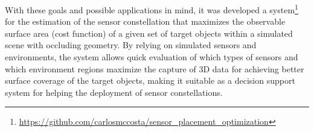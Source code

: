 With these goals and possible applications in mind, it was developed a system\footnote{\url{https://github.com/carlosmccosta/sensor_placement_optimization}} for the estimation of the sensor constellation that maximizes the observable surface area (cost function) of a given set of target objects within a simulated scene with occluding geometry. By relying on simulated sensors and environments, the system allows quick evaluation of which types of sensors and which environment regions maximize the capture of 3D data for achieving better surface coverage of the target objects, making it suitable as a decision support system for helping the deployment of sensor constellations.


